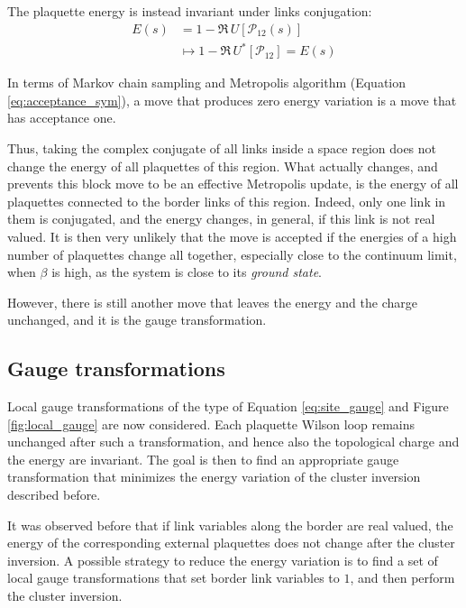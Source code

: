 The plaquette energy is instead invariant under links conjugation:
\[\begin{aligned}
    E(s) &= 1-\Re\,U[\mathcal P_{12}(s)] \\
         &\mapsto 1-\Re\,U^*[\mathcal P_{12}] = E(s)
\end{aligned}\]

In terms of Markov chain sampling and Metropolis algorithm (Equation \ref{eq:acceptance_sym}),
a move that produces zero energy variation is a move that has acceptance one.

Thus, taking the complex conjugate of all links inside a space region does not change the energy of all plaquettes of this region.
What actually changes, and prevents this block move to be an effective Metropolis update,
is the energy of all plaquettes connected to the border links of this region.
Indeed, only one link in them is conjugated, and the energy changes, in general, if this link is not real valued.
It is then very unlikely that the move is accepted if the energies of a high number of plaquettes change all together,
especially close to the continuum limit, when $\beta$ is high, as the system is close to its \emph{ground state}.

However, there is still another move that leaves the energy and the charge unchanged,
and it is the gauge transformation.

\subsection*{Gauge transformations}
Local gauge transformations of the type of Equation \eqref{eq:site_gauge} and Figure \ref{fig:local_gauge} are now considered.
Each plaquette Wilson loop remains unchanged after such a transformation,
and hence also the topological charge and the energy are invariant.
The goal is then to find an appropriate gauge transformation that minimizes the energy variation of the cluster inversion described before.

It was observed before that if link variables along the border are real valued,
the energy of the corresponding external plaquettes does not change after the cluster inversion.
A possible strategy to reduce the energy variation is to find a set of local gauge transformations that set border link variables to $1$,
and then perform the cluster inversion.

